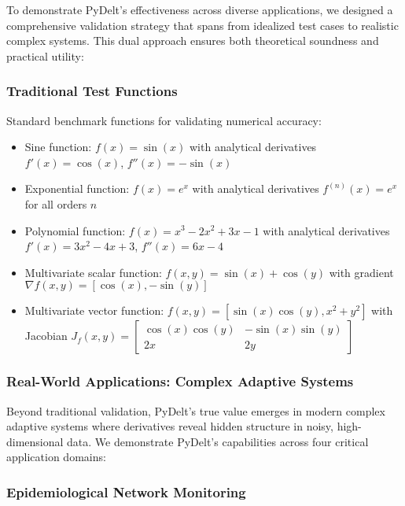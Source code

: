 \documentclass[10pt,journal,compsoc]{IEEEtran}
\begin{document}
To demonstrate PyDelt's effectiveness across diverse applications, we designed a comprehensive validation strategy that spans from idealized test cases to realistic complex systems. This dual approach ensures both theoretical soundness and practical utility:

\subsubsection{Traditional Test Functions}

Standard benchmark functions for validating numerical accuracy:
\begin{itemize}
    \item Sine function: $f(x) = \sin(x)$ with analytical derivatives $f'(x) = \cos(x)$, $f''(x) = -\sin(x)$
    
    \item Exponential function: $f(x) = e^x$ with analytical derivatives $f^{(n)}(x) = e^x$ for all orders $n$
    
    \item Polynomial function: $f(x) = x^3 - 2x^2 + 3x - 1$ with analytical derivatives $f'(x) = 3x^2 - 4x + 3$, $f''(x) = 6x - 4$
    
    \item Multivariate scalar function: $f(x,y) = \sin(x) + \cos(y)$ with gradient $\nabla f(x,y) = [\cos(x), -\sin(y)]$
    
    \item Multivariate vector function: $f(x,y) = [\sin(x)\cos(y), x^2 + y^2]$ with Jacobian $J_f(x,y) = \begin{bmatrix} \cos(x)\cos(y) & -\sin(x)\sin(y) \\ 2x & 2y \end{bmatrix}$
\end{itemize}

\subsubsection{Real-World Applications: Complex Adaptive Systems}

Beyond traditional validation, PyDelt's true value emerges in modern complex adaptive systems where derivatives reveal hidden structure in noisy, high-dimensional data. We demonstrate PyDelt's capabilities across four critical application domains:

\subsubsection{Epidemiological Network Monitoring}
\end{document}
